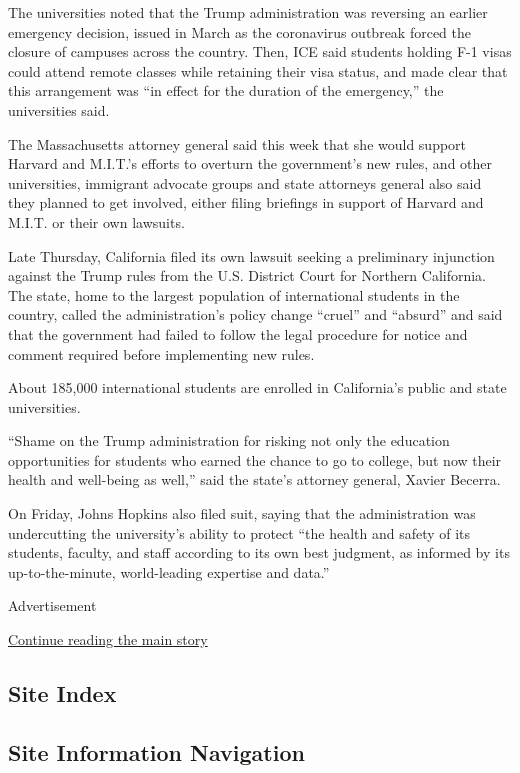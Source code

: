 The universities noted that the Trump administration was reversing an
earlier emergency decision, issued in March as the coronavirus outbreak
forced the closure of campuses across the country. Then, ICE said
students holding F-1 visas could attend remote classes while retaining
their visa status, and made clear that this arrangement was ``in effect
for the duration of the emergency,'' the universities said.

The Massachusetts attorney general said this week that she would support
Harvard and M.I.T.'s efforts to overturn the government's new rules, and
other universities, immigrant advocate groups and state attorneys
general also said they planned to get involved, either filing briefings
in support of Harvard and M.I.T. or their own lawsuits.

Late Thursday, California filed its own lawsuit seeking a preliminary
injunction against the Trump rules from the U.S. District Court for
Northern California. The state, home to the largest population of
international students in the country, called the administration's
policy change ``cruel'' and ``absurd'' and said that the government had
failed to follow the legal procedure for notice and comment required
before implementing new rules.

About 185,000 international students are enrolled in California's public
and state universities.

``Shame on the Trump administration for risking not only the education
opportunities for students who earned the chance to go to college, but
now their health and well-being as well,'' said the state's attorney
general, Xavier Becerra.

On Friday, Johns Hopkins also filed suit, saying that the administration
was undercutting the university's ability to protect ``the health and
safety of its students, faculty, and staff according to its own best
judgment, as informed by its up-to-the-minute, world-leading expertise
and data.''

Advertisement

\protect\hyperlink{after-bottom}{Continue reading the main story}

\hypertarget{site-index}{%
\subsection{Site Index}\label{site-index}}

\hypertarget{site-information-navigation}{%
\subsection{Site Information
Navigation}\label{site-information-navigation}}

